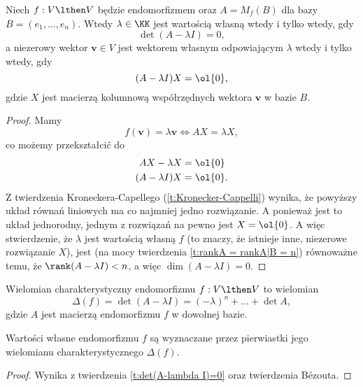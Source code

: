 \begin{theorem}
    \label{t:det(A-lambda I)=0}
    Niech $f : V \lthen V$ będzie endomorfizmem oraz $A = M_f(B)$ dla bazy $B = (e_1, \ldots, e_n)$. Wtedy $\lambda \in \KK$ jest wartością własną wtedy i tylko wtedy, gdy
    \[ \det(A - \lambda I) = 0, \]
    a niezerowy wektor $\mathbf{v} \in V$ jest wektorem własnym odpowiającym $\lambda$ wtedy i tylko wtedy, gdy
    \[ (A - \lambda I)X = \ol{0}, \]
    gdzie $X$ jest macierzą kolumnową współrzędnych wektora $\mathbf{v}$ w bazie $B$.
\end{theorem}
\begin{proof}
    Mamy
    \[ f(\mathbf{v}) = \lambda\mathbf{v} \iff AX = \lambda X, \]
    co możemy przekształcić do
    \begin{align*}
        AX - \lambda X &= \ol{0} \\
        (A - \lambda I)X &= \ol{0}.
    \end{align*}
    Z twierdzenia Kroneckera-Capellego (\ref{t:Kronecker-Cappelli}) wynika, że powyższy układ równań liniowych ma co najmniej jedno rozwiązanie. A ponieważ jest to układ jednorodny, jednym z rozwiązań na pewno jest $X = \ol{0}$. A więc stwierdzenie, że $\lambda$ jest wartością własną $f$ (to znaczy, że istnieje inne, niezerowe rozwiązanie $X$), jest (na mocy twierdzenia \ref{t:rankA = rankA|B = n}) równoważne temu, że $\rank (A - \lambda I) < n$, a więc $\dim (A - \lambda I) = 0$.
\end{proof}

\begin{definition}
    Wielomian charakterystyczny endomorfizmu $f : V \lthen V$ to wielomian
    \[ \Delta(f) = \det(A - \lambda I) = (-\lambda)^n + \ldots + \det A, \]
    gdzie $A$ jest macierzą endomorfizmu $f$ w dowolnej bazie.
\end{definition}

\begin{fact}
    \label{f:roots of the characteristic polynomial are eigenvalues}
    Wartości własne endomorfizmu $f$ są wyznaczane przez pierwiastki jego wielomianu charakterystycznego $\Delta(f)$.
\end{fact}
\begin{proof}
    Wynika z twierdzenia \ref{t:det(A-lambda I)=0} oraz twierdzenia Bézouta.
\end{proof}

